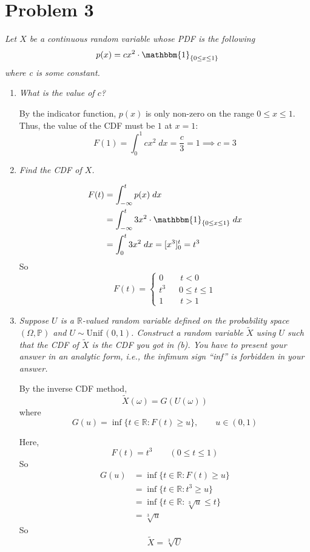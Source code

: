 \documentclass[12pt]{article}
\renewcommand{\P}{\mathbb{P}}
\newcommand{\R}{\mathbb{R}}
\newcommand{\ind}{\mathbbm{1}}
\newcommand{\Unif}{\text{Unif}\,}
\begin{document}
\section*{Problem 3}
\emph{Let $X$ be a continuous random variable whose PDF is the following}
    \[p(x)=  cx^2 \cdot \ind_{\{0 \leq x \leq 1\}}\]
\emph{where c is some constant.}
\begin{enumerate}[label=(\alph*)]
    \item \emph{What is the value of $c$?}
        
        \color{blue}
            By the indicator function, $p(x)$ is only non-zero on the range $0 \leq x \leq 1$. Thus, the value of the CDF must be $1$ at $x=1$:
            \[F(1) = \int_0^1 cx^2 \; dx = \frac{c}{3} = 1 \implies \boxed{c = 3}\]
        \color{black}

    \item \emph{Find the CDF of $X$.}
    
        \color{blue}
            \begin{align*}
                F(t) &= \int_{-\infty}^t p(x)\; dx\\
                    &= \int_{-\infty}^t 3x^2 \cdot \ind_{\{0 \leq x \leq 1\}} \; dx\\
                    &= \int_0^t 3x^2\; dx = [x^3]_0^t = t^3
            \end{align*}
            So 
            \[\boxed{F(t) = \begin{cases}
                0 \qquad t < 0\\
                t^3 \quad \;\; 0 \leq t \leq 1\\
                1 \qquad t > 1
            \end{cases}}\]
        \color{black}

    \item \emph{Suppose $U$ is a $\R$-valued random variable defined on the probability space $(\Omega, \P)$ and $U \sim \Unif(0, 1)$. Construct a random variable $\tilde X$ using $U$ such that the CDF of $\tilde X$ is the CDF you got in (b). You have to present your answer in an analytic form, i.e., the infimum sign ``inf'' is forbidden in your answer.}
    
        \color{blue}
            By the inverse CDF method, 
            \[\tilde X(\omega) = G(U(\omega))\]
            where 
            \[G(u) = \inf\{t \in \R: F(t) \geq u\}, \qquad u \in (0, 1)\]
           
            Here,
            \[F(t) = t^3 \qquad (0 \leq t \leq 1)\]
            So 
            \begin{align*}
                G(u) &= \inf\{t \in \R: F(t) \geq u\}\\
                &= \inf\{t \in \R: t^3 \geq u\}\\
                &= \inf\{t \in \R: \sqrt[3]{u} \leq t\}\\
                &= \sqrt[3]{u}
            \end{align*}
            So 
            \[\boxed{\tilde X = \sqrt[3]{U}}\]
        \color{black}


\end{enumerate}
\end{document}
